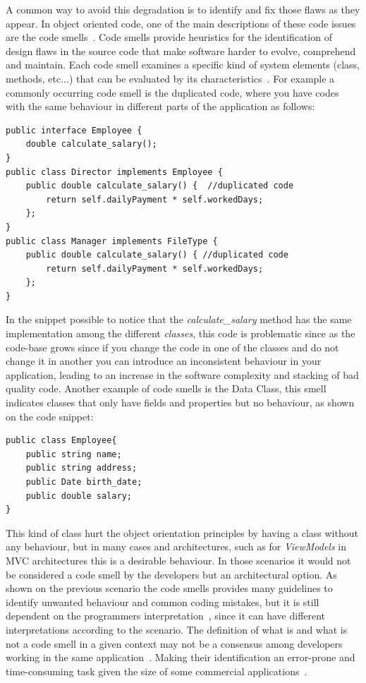 A common way to avoid this degradation is to identify and fix those flaws as they appear. In object oriented code, one of the main descriptions of these code issues are the code smells~\citep{mens2004survey}. Code smells provide heuristics for the identification of design flaws in the source code that make software harder to evolve, comprehend and maintain. Each code smell examines a specific kind of system elements (class, methods, etc...) that can be evaluated by its characteristics~\citep{olbrich2009evolution}. For example a commonly occurring code smell is the duplicated code, where you have codes with the same behaviour in different parts of the application as follows:
\begin{lstlisting}
public interface Employee {
    double calculate_salary();
}
public class Director implements Employee {    
    public double calculate_salary() {  //duplicated code
        return self.dailyPayment * self.workedDays;
    };
}
public class Manager implements FileType {
    public double calculate_salary() { //duplicated code
        return self.dailyPayment * self.workedDays;
    };
}
\end{lstlisting}

In the snippet possible to notice that the \textit{calculate\_salary} method has the same implementation among the different \textit{classes}, this code is problematic since as the code-base grows since if you change the code in one of the classes and do not change it in another you can introduce an inconsistent behaviour in your application, leading to an increase in the software complexity and stacking of bad quality code. Another example of code smells is the Data Class, this smell indicates classes that only have fields and properties but no behaviour, as shown on the code snippet:

\begin{lstlisting}
public class Employee{    
    public string name;
    public string address;
    public Date birth_date;
    public double salary;
}
\end{lstlisting}

This kind of class hurt the object orientation principles by having a class without any behaviour, but in many cases and architectures, such as for \textit{ViewModels} in MVC architectures this is a desirable behaviour. In those scenarios it would not be considered a code smell by the developers but an architectural option. As shown on the previous scenario the code smells provides many guidelines to identify unwanted behaviour and common coding mistakes, but it is still dependent on the programmers interpretation~\citep{fowler1999refactoring}, since it can have different interpretations according to the scenario. The definition of what is and what is not a code smell in a given context may not be a consensus among developers working in the same application~\citep{bryton2009strengthening, fontana2016comparing}. Making their identification an error-prone and time-consuming task given the size of some commercial applications~\citep{murphy2012we}.

